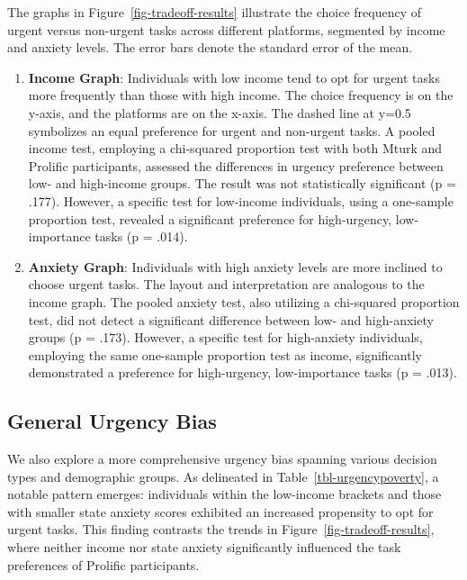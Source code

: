 \documentclass[
]{report}
\begin{document}
The graphs in Figure~\ref{fig-tradeoff-results} illustrate the choice
frequency of urgent versus non-urgent tasks across different platforms,
segmented by income and anxiety levels. The error bars denote the
standard error of the mean.

\begin{enumerate}
\def\labelenumi{\arabic{enumi}.}
\item
  \textbf{Income Graph}: Individuals with low income tend to opt for
  urgent tasks more frequently than those with high income. The choice
  frequency is on the y-axis, and the platforms are on the x-axis. The
  dashed line at y=0.5 symbolizes an equal preference for urgent and
  non-urgent tasks. A pooled income test, employing a chi-squared
  proportion test with both Mturk and Prolific participants, assessed
  the differences in urgency preference between low- and high-income
  groups. The result was not statistically significant (p = .177).
  However, a specific test for low-income individuals, using a
  one-sample proportion test, revealed a significant preference for
  high-urgency, low-importance tasks (p = .014).
\item
  \textbf{Anxiety Graph}: Individuals with high anxiety levels are more
  inclined to choose urgent tasks. The layout and interpretation are
  analogous to the income graph. The pooled anxiety test, also utilizing
  a chi-squared proportion test, did not detect a significant difference
  between low- and high-anxiety groups (p = .173). However, a specific
  test for high-anxiety individuals, employing the same one-sample
  proportion test as income, significantly demonstrated a preference for
  high-urgency, low-importance tasks (p = .013).
\end{enumerate}

\hypertarget{general-urgency-bias}{%
\subsection{General Urgency Bias}\label{general-urgency-bias}}

We also explore a more comprehensive urgency bias spanning various
decision types and demographic groups. As delineated in
Table~\ref{tbl-urgencypoverty}, a notable pattern emerges: individuals
within the low-income brackets and those with smaller state anxiety
scores exhibited an increased propensity to opt for urgent tasks. This
finding contrasts the trends in Figure~\ref{fig-tradeoff-results}, where
neither income nor state anxiety significantly influenced the task
preferences of Prolific participants.
\end{document}

